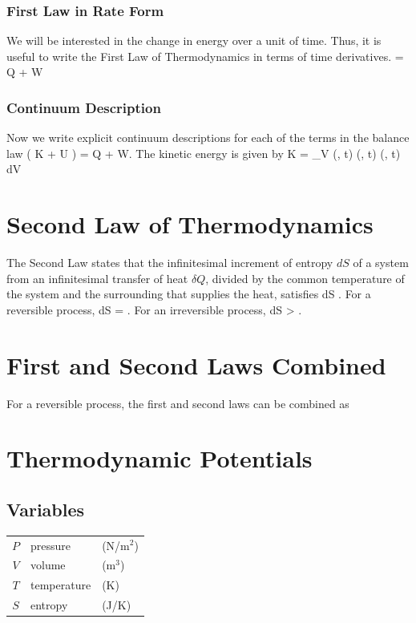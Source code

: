 \subsubsection{First Law in Rate Form}
We will be interested in the change in energy over a unit of time.
Thus, it is useful to write the First Law of Thermodynamics in
terms of time derivatives.
\be
{} = \delta \dot Q + \delta \dot W
\ee


\subsubsection{Continuum Description}
Now we write explicit continuum descriptions for each of the 
terms in the balance law
\be
{} ( K + U ) = \delta \dot Q + \delta \dot W.
\ee
The kinetic energy is given by
\be
K = \int_V \half \; \rho(\vx, t) \; \vv(\vx, t) \cdot \vv(\vx, t) \; dV 
\ee

\section{Second Law of Thermodynamics}
The Second Law states that the infinitesimal increment of entropy $dS$ 
of a system from an infinitesimal transfer of heat $\delta Q$, divided
by the common temperature of the system and the surrounding that supplies the
heat, satisfies
\be
dS \geq \dst{}.
\ee
For a reversible process, 
\be
dS = \dst{}.
\ee
For an irreversible process, 
\be
dS > \dst{}.
\ee

\section{First and Second Laws Combined}
For a reversible process, the first and second laws can be combined as
\be
{}
\ee

\section{Thermodynamic Potentials}
\subsection{Variables}

\begin{tabular}{cll}
$P$ & pressure &  (N/m$^2$) \\
$V$ & volume & (m$^3$)\\
$T$ & temperature & (K) \\
$S$ & entropy & (J/K) 
\end{tabular}

